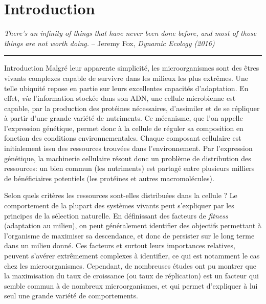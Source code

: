 \chapter{Introduction}
\label{chap:introduction}

\textit{There's an infinity of things that have never been done before, and most of those things are not worth doing.} -- Jeremy Fox, \textit{Dynamic Ecology (2016)}~\cite{fox_how_2016}

\begin{center}
\noindent\rule{4cm}{0.1pt}
\end{center}

\begin{chapter_summary}{Introduction}
Malgré leur apparente simplicité, les microorganismes sont des êtres vivants complexes capable de survivre dans les milieux les plus extrêmes.
Une telle ubiquité repose en partie sur leurs excellentes capacités d'adaptation.
En effet, \textit{via} l'information stockée dans son ADN, une cellule microbienne est capable, par la production des protéines nécessaires, d'assimiler et de se répliquer à partir d'une grande variété de nutriments.
Ce mécanisme, que l'on appelle l'expression génétique, permet donc à la cellule de réguler sa composition en fonction des conditions environnementales.
Chaque composant cellulaire est initialement issu des ressources trouvées dans l'environnement.
Par l'expression génétique, la machinerie cellulaire résout donc un problème de distribution des ressources: un bien commun (les nutriments) est partagé entre plusieurs milliers de bénéficiaires potentiels (les protéines et autres macromolécules).

Selon quels critères les ressources sont-elles distribuées dans la cellule ?
Le comportement de la plupart des systèmes vivants peut s'expliquer par les principes de la sélection naturelle.
En définissant des facteurs de \textit{fitness} (adaptation au milieu), on peut généralement identifier des objectifs permettant à l'organisme de maximiser sa descendance, et donc de persister sur le long terme dans un milieu donné.
Ces facteurs et surtout leurs importances relatives, peuvent s'avérer extrêmement complexes à identifier, 
ce qui est notamment le cas chez les microorganismes.
Cependant, de nombreuses études ont pu montrer que la maximisation du taux de croissance (ou taux de réplication) est un facteur qui semble commun à de nombreux microorganismes, et qui permet d'expliquer à lui seul une grande variété de comportements.


\end{chapter_summary}

